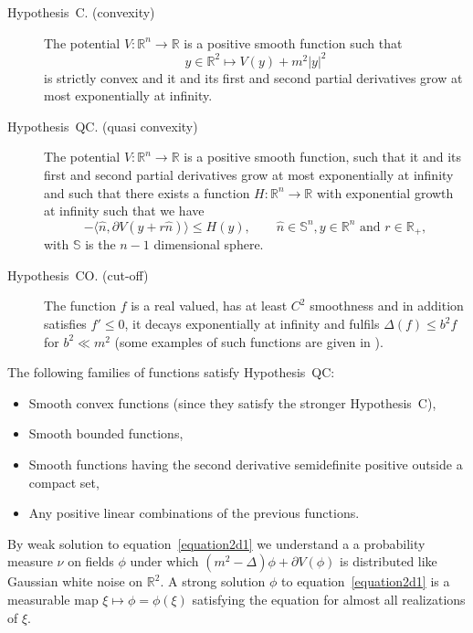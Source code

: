 \documentclass[a4paper,10pt]{article}
\newenvironment{itemizedot}{\begin{itemize} \renewcommand{\labelitemi}{$\bullet$}\renewcommand{\labelitemii}{$\bullet$}\renewcommand{\labelitemiii}{$\bullet$}\renewcommand{\labelitemiv}{$\bullet$}}{\end{itemize}}
\newcommand{\descriptionparagraphs}[1]{\begin{description}#1\end{description}}
\begin{document}
{\descriptionparagraphs{\item[Hypothesis~C. (convexity)] The potential $V :
\mathbb{R}^n \rightarrow \mathbb{R}$ is a positive smooth function such that
\[ y \in \mathbb{R}^2 \mapsto V (y) + m^2 | y |^2 \]
is strictly convex and it and its first and second partial derivatives grow at
most exponentially at infinity.

\item[Hypothesis~QC. (quasi convexity)] The potential $V : \mathbb{R}^n
\rightarrow \mathbb{R}$ is a positive smooth function, such that it and its
first and second partial derivatives grow at most exponentially at infinity
and such that there exists a function $H : \mathbb{R}^n \rightarrow
\mathbb{R}$ with exponential growth at infinity such that we have
\[ - \langle \hat{n}, \partial V (y + r \hat{n}) \rangle \leqslant H (y),
   \qquad \text{$\hat{n} \in \mathbb{S}^n, y \in \mathbb{R}^n$ and $r \in
   \mathbb{R}_+$}, \]
with $\mathbb{S}$ is the $n - 1$ dimensional sphere.

\item[Hypothesis~CO. (cut-off) ] The function $f$ is a real valued, has at
least $C^2$ smoothness and in addition satisfies $f' \leqslant 0$, it decays
exponentially at infinity and fulfils $\Delta (f) \leqslant b^2 f$ for $b^2
\ll m^2$ (some examples of such functions are given in {\cite{Klein1984}}).}}

\begin{remark}
  The following families of functions satisfy Hypothesis~QC:
  \begin{itemizedot}
    \item Smooth convex functions (since they satisfy the stronger
    Hypothesis~C),
    
    \item Smooth bounded functions,
    
    \item Smooth functions having the second derivative semidefinite positive
    outside a compact set,
    
    \item Any positive linear combinations of the previous functions.
  \end{itemizedot}
\end{remark}

By weak solution to equation~{\eqref{equation2d1}} we understand a a
probability measure $\nu$ on fields $\phi$ under which $(m^2 - \Delta) \phi +
\partial V (\phi)$ is distributed like Gaussian white noise on $\mathbb{R}^2$.
A strong solution $\phi$ to equation~{\eqref{equation2d1}} is a measurable map
$\xi \mapsto \phi = \phi (\xi)$ satisfying the equation for almost all
realizations of $\xi$.
\end{document}

